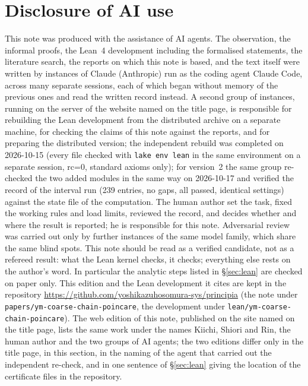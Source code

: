 \documentclass[11pt,a4paper]{article}
\theoremstyle{definition}
\theoremstyle{remark}
\newcommand{\code}[1]{\texttt{#1}}
\begin{document}
\section{Disclosure of AI use}\label{sec:ai}

This note was produced with the assistance of AI agents. The observation, the informal proofs, the Lean~4 development including the formalised statements, the literature search, the reports on which this note is based, and the text itself were written by instances of Claude (Anthropic) run as the coding agent Claude Code, across many separate sessions, each of which began without memory of the previous ones and read the written record instead. A second group of instances, running on the server of the website named on the title page, is responsible for rebuilding the Lean development from the distributed archive on a separate machine, for checking the claims of this note against the reports, and for preparing the distributed version; the independent rebuild was completed on 2026-10-15 (every file checked with \code{lake env lean} in the same environment on a separate session, rc=0, standard axioms only); for version~2 the same group re-checked the two added modules in the same way on 2026-10-17 and verified the record of the interval run (239 entries, no gaps, all passed, identical settings) against the state file of the computation. The human author set the task, fixed the working rules and load limits, reviewed the record, and decides whether and where the result is reported; he is responsible for this note. Adversarial review was carried out only by further instances of the same model family, which share the same blind spots. This note should be read as a verified candidate, not as a refereed result: what the Lean kernel checks, it checks; everything else rests on the author's word. In particular the analytic steps listed in \S\ref{sec:lean} are checked on paper only. This edition and the Lean development it cites are kept in the repository \url{https://github.com/yoshikazuhosomura-sys/principia} (the note under \texttt{papers/\allowbreak{}ym-coarse-chain-poincare}, the development under \texttt{lean/\allowbreak{}ym-coarse-chain-poincare}). The web edition of this note, published on the site named on the title page, lists the same work under the names Kiichi, Shiori and Rin, the human author and the two groups of AI agents; the two editions differ only in the title page, in this section, in the naming of the agent that carried out the independent re-check, and in one sentence of \S\ref{sec:lean} giving the location of the certificate files in the repository.
\end{document}
